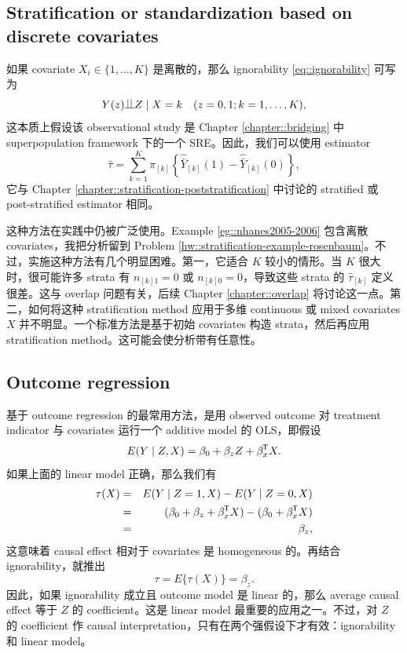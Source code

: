\subsection{Stratification or standardization based on discrete covariates}

如果 covariate $X_i \in \{1, \ldots, K \}$ 是离散的，那么 ignorability \eqref{eq::ignorability} 可写为 
 $$
 Y(z) \ind Z \mid X = k \quad (z=0,1; k=1,\ldots, K),
 $$
这本质上假设该 observational study 是 Chapter \ref{chapter::bridging} 中 superpopulation framework 下的一个 SRE。因此，我们可以使用 estimator
$$
\hat{\tau} = \sum_{k=1}^K \pi_{[k]} \left\{   \hat{\bar{Y}}_{[k]}(1) - \hat{\bar{Y}}_{[k]}(0)   \right\},
$$
它与 Chapter \ref{chapter::stratification-poststratification} 中讨论的 stratified 或 post-stratified estimator 相同。 


这种方法在实践中仍被广泛使用。Example \ref{eg::nhanes2005-2006} 包含离散 covariates，我把分析留到 Problem \ref{hw::stratification-example-rosenbaum}。不过，实施这种方法有几个明显困难。第一，它适合 $K$ 较小的情形。当 $K$ 很大时，很可能许多 strata 有 $n_{[k]1}  = 0$ 或 $n_{[k]0} = 0$，导致这些 strata 的 $\hat{\tau}_{[k]}$ 定义很差。这与 overlap 问题有关，后续 Chapter \ref{chapter::overlap} 将讨论这一点。第二，如何将这种 stratification method 应用于多维 continuous 或 mixed covariates $X$ 并不明显。一个标准方法是基于初始 covariates 构造 strata，然后再应用 stratification method。这可能会使分析带有任意性。 


\subsection{Outcome regression}\label{sec::outcome-regression}


基于 outcome regression 的最常用方法，是用 observed outcome 对 treatment indicator 与 covariates 运行一个 additive model 的 OLS，即假设
$$
E(Y\mid Z, X) = \beta_0 + \beta_z Z  + \beta_x ^{\mkern-1.5mu\mathsf{T}} X .
$$
如果上面的 linear model 正确，那么我们有
\begin{eqnarray*}
\tau(X) &=&  E(Y\mid Z=1, X) - E(Y\mid Z=0, X) \\
&=& (\beta_0 + \beta_z   + \beta_x^{\mkern-1.5mu\mathsf{T}}  X ) - ( \beta_0    + \beta_x^{\mkern-1.5mu\mathsf{T}}  X )  \\
&=& \beta_z,
\end{eqnarray*}
这意味着 causal effect 相对于 covariates 是 homogeneous 的。再结合 ignorability，就推出
$$
\tau = E\{ \tau(X)  \} = \beta_z.
$$
因此，如果 ignorability 成立且 outcome model 是 linear 的，那么 average causal effect 等于 $Z$ 的 coefficient。这是 linear model 最重要的应用之一。不过，对 $Z$ 的 coefficient 作 causal interpretation，只有在两个强假设下才有效：ignorability 和 linear model。 
 
